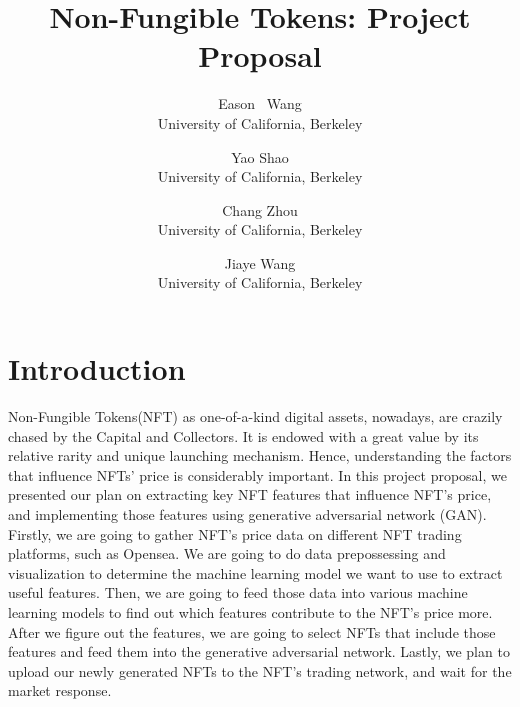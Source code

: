 \usepackage{filecontents}



\date{}

\title{\Large \bf Non-Fungible Tokens: Project Proposal}

\author{
{\rm Eason \ Wang}\\
University of California, Berkeley
\and
{\rm Yao Shao}\\
University of California, Berkeley
\and
{\rm Chang Zhou}\\
University of California, Berkeley
\and
{\rm Jiaye Wang}\\
University of California, Berkeley
} %

\maketitle

\section{Introduction}
Non-Fungible Tokens(NFT) as one-of-a-kind digital assets, nowadays, are crazily chased by the Capital and Collectors. It is endowed with a great value by its relative rarity and unique launching mechanism. Hence, understanding the factors that influence NFTs’ price is considerably important. In this project proposal, we presented our plan on extracting key NFT features that influence NFT’s price, and implementing those features using generative adversarial network (GAN). Firstly, we are going to gather NFT’s price data on different NFT trading platforms, such as Opensea. We are going to do data prepossessing and visualization to determine the machine learning model we want to use to extract useful features. Then, we are going to feed those data into various machine learning models to find out which features contribute to the NFT’s price more. After we figure out the features, we are going to select NFTs that include those features and feed them into the generative adversarial network. Lastly, we plan to upload our newly generated NFTs to the NFT’s trading network, and wait for the market response.



